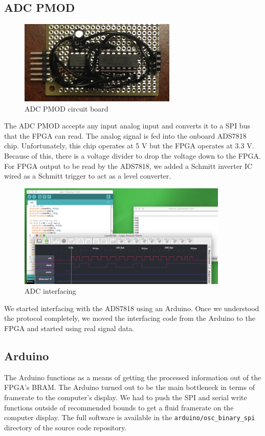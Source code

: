 \documentclass[12pt]{article}
\begin{document}
    \subsection*{ADC PMOD}
      \begin{figure}[H]
        \centering
        \includegraphics[width=75mm]{adc_pmod.JPG}
        \caption{ADC PMOD circuit board}
        \label{overflow}
      \end{figure}
      The ADC PMOD accepts any input analog input and converts it to a SPI bus that the FPGA can read. The analog signal is fed into the onboard ADS7818 chip. Unfortunately, this chip operates at 5 V but the FPGA operates at 3.3 V. Because of this, there is a voltage divider to drop the voltage down to the FPGA. For FPGA output to be read by the ADS7818, we added a Schmitt inverter IC wired as a Schmitt trigger to act as a level converter.
      \begin{figure}[H]
        \centering
        \includegraphics[width=100mm]{adc_logic.png}
        \caption{ADC interfacing}
        \label{overflow}
      \end{figure}
      We started interfacing with the ADS7818 using an Arduino. Once we understood the protocol completely, we moved the interfacing code from the Arduino to the FPGA and started using real signal data.

    \subsection*{Arduino}
      The Arduino functions as a means of getting the processed information out of the FPGA's BRAM. The Arduino turned out to be the main bottleneck in terms of framerate to the computer's display. We had to push the SPI and serial write functions outside of recommended bounds to get a fluid framerate on the computer display. The full software is available in the \texttt{arduino/osc\_binary\_spi} directory of the source code repository.
\end{document}
